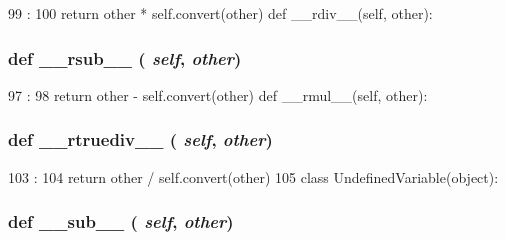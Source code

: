 \begin{DoxyCode}
99                              :
100         return other * self.convert(other)
    def __rdiv__(self, other):
\end{DoxyCode}
\hypertarget{classm5_1_1util_1_1smartdict_1_1Variable_a26684466f80bb9a04c0ce1d592b89251}{
\subsubsection[{\_\-\_\-rsub\_\-\_\-}]{\setlength{\rightskip}{0pt plus 5cm}def \_\-\_\-rsub\_\-\_\- ( {\em self}, \/   {\em other})}}
\label{classm5_1_1util_1_1smartdict_1_1Variable_a26684466f80bb9a04c0ce1d592b89251}



\begin{DoxyCode}
97                              :
98         return other - self.convert(other)
    def __rmul__(self, other):
\end{DoxyCode}
\hypertarget{classm5_1_1util_1_1smartdict_1_1Variable_ac1649bc3921cc74d327ac43cafaab179}{
\subsubsection[{\_\-\_\-rtruediv\_\-\_\-}]{\setlength{\rightskip}{0pt plus 5cm}def \_\-\_\-rtruediv\_\-\_\- ( {\em self}, \/   {\em other})}}
\label{classm5_1_1util_1_1smartdict_1_1Variable_ac1649bc3921cc74d327ac43cafaab179}



\begin{DoxyCode}
103                                  :
104         return other / self.convert(other)
105 
class UndefinedVariable(object):
\end{DoxyCode}
\hypertarget{classm5_1_1util_1_1smartdict_1_1Variable_a92f51217c100657d0bf6f97b150c0a7c}{
\subsubsection[{\_\-\_\-sub\_\-\_\-}]{\setlength{\rightskip}{0pt plus 5cm}def \_\-\_\-sub\_\-\_\- ( {\em self}, \/   {\em other})}}
\label{classm5_1_1util_1_1smartdict_1_1Variable_a92f51217c100657d0bf6f97b150c0a7c}



